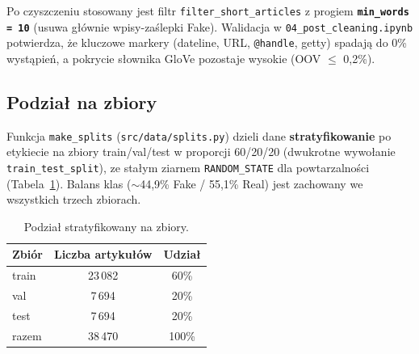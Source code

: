 Po czyszczeniu stosowany jest filtr \texttt{filter\_short\_articles} z progiem
\textbf{\texttt{min\_words = 10}} (usuwa głównie wpisy-zaślepki Fake). Walidacja w
\texttt{04\_post\_cleaning.ipynb} potwierdza, że kluczowe markery (dateline, URL,
\texttt{@handle}, getty) spadają do 0\% wystąpień, a pokrycie słownika GloVe pozostaje
wysokie (OOV $\le$ 0{,}2\%).

\subsection{Podział na zbiory}

Funkcja \texttt{make\_splits} (\texttt{src/data/splits.py}) dzieli dane
\textbf{stratyfikowanie} po etykiecie na zbiory train/val/test w proporcji
60/20/20 (dwukrotne wywołanie \texttt{train\_test\_split}), ze stałym ziarnem
\texttt{RANDOM\_STATE} dla powtarzalności (Tabela~\ref{tab:splits}). Balans klas
($\sim$44{,}9\% Fake / 55{,}1\% Real) jest zachowany we wszystkich trzech zbiorach.

\begin{table}[H]
  \centering
  \caption{Podział stratyfikowany na zbiory.}
  \label{tab:splits}
  \begin{tabular}{lcc}
    \toprule
    \textbf{Zbiór} & \textbf{Liczba artykułów} & \textbf{Udział} \\
    \midrule
    train & 23\,082 & 60\% \\
    val   & 7\,694  & 20\% \\
    test  & 7\,694  & 20\% \\
    \midrule
    razem & 38\,470 & 100\% \\
    \bottomrule
  \end{tabular}
\end{table}
